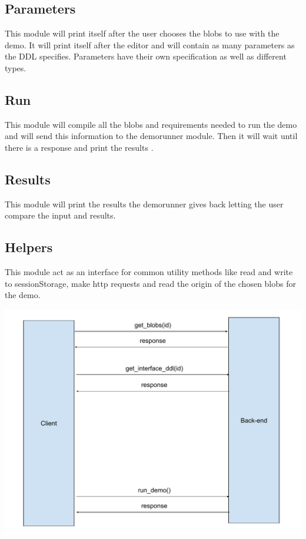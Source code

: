 \subsection{Parameters}
This module will print itself after  the user chooses the blobs to use with the demo. It will print itself after the editor  and will 
contain as many parameters as the DDL specifies. Parameters have their own specification as well as different types.

\subsection{Run}
This module will compile  all the blobs and requirements needed to run the demo and will send this information to the demorunner  module. Then it will wait  until there is a response and print the results .

\subsection{Results}
This module will print the results the demorunner gives back  letting the user compare the input and results.

\subsection{Helpers}
This module act as an interface for common utility methods like read and write to sessionStorage, make http  requests and 
read the origin  of the chosen blobs for the demo.

\includegraphics[width=\textwidth]{images/client_server_interaction}

